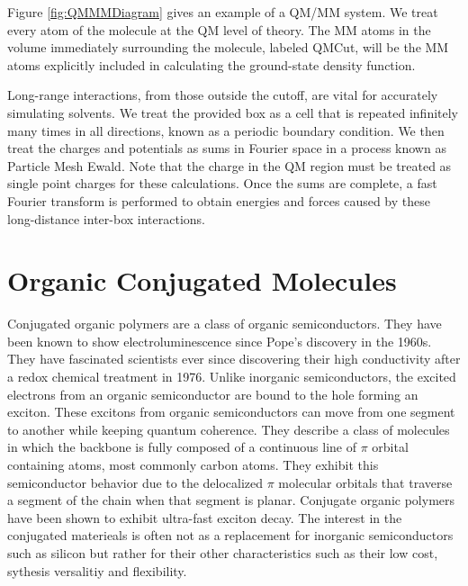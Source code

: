 Figure \ref{fig:QMMMDiagram} gives an example of a QM/MM system.
We treat every atom of the molecule at the QM level of theory. The MM atoms in the volume immediately surrounding the molecule, labeled QMCut, will be the MM atoms explicitly included in calculating the ground-state density function. 

Long-range interactions, from those outside the cutoff, are vital for accurately simulating solvents. 
We treat the provided box as a cell that is repeated infinitely many times in all directions, known as a periodic boundary condition. We then treat the charges and potentials as sums in Fourier space in a process known as Particle Mesh Ewald.\cite{Darden1993} Note that the charge in the QM region must be treated as single point charges for these calculations. Once the sums are complete, a fast Fourier transform is performed to obtain energies and forces caused by these long-distance inter-box interactions. \cite{Walker2008}

\section{Organic Conjugated Molecules}
Conjugated organic polymers are a class of organic semiconductors. They have been known to show electroluminescence since Pope's discovery in the 1960s.\cite{pope1963electroluminescence} They have fascinated scientists ever since discovering their high conductivity after a redox chemical treatment in 1976. \cite{chiang1977electrical} Unlike inorganic semiconductors, the excited electrons from an organic semiconductor are bound to the hole forming an exciton.\cite{scholes2011excitons} These excitons from organic semiconductors can move from one segment to another while keeping quantum coherence. \cite{collini2009coherent} They describe a class of molecules in which the backbone is fully composed of a continuous line of \(\pi\) orbital containing atoms, most commonly carbon atoms. They exhibit this semiconductor behavior due to the delocalized \(\pi\) molecular orbitals that traverse a segment of the chain when that segment is planar.\cite{bredas1999excited}
Conjugate organic polymers have been shown to exhibit ultra-fast exciton decay.\cite{nelson2018coherent,Fernandez-Alberti2009} The interest in the conjugated materieals is often not as a replacement for inorganic semiconductors such as silicon but rather for their other characteristics such as their low cost, sythesis versalitiy and flexibility. \cite{bredas1999excited}


